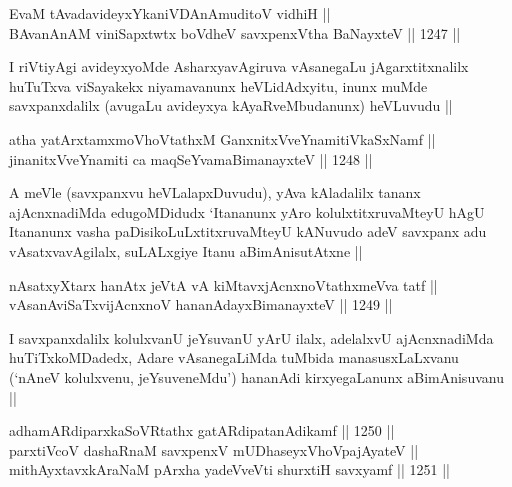 \begin{shl}
EvaM tAvadavideyxYkaniVDAnAmuditoV vidhiH || \\
BAvanAnAM viniSapxtwtx boVdheV savxpenxV\s tha BaNayxteV ||  1247 ||  
\end{shl}

\begin{artha}
I riVtiyAgi avideyxyoMde AsharxyavAgiruva vAsanegaLu jAgarxtitxnalilx huTuTxva viSayakekx niyamavanunx heVLidAdxyitu, inunx muMde savxpanxdalilx (avugaLu avideyxya kAyaRveMbudanunx) heVLuvudu ||
\end{artha}


\begin{shl}
atha yatArx\s \s tamxmoVhoVtathxM GanxnitxVveYnamitiVkaSxNamf || \\
jinanitxVveYnamiti ca maqSeYvamaBimanayxteV ||  1248 ||  
\end{shl}

\begin{artha}
A meVle (savxpanxvu heVLalapxDuvudu), yAva kAladalilx tananx ajAcnxnadiMda edugoMDidudx `Itananunx yAro kolulxtitxruvaMteyU hAgU Itananunx vasha paDisikoLuLxtitxruvaMteyU kANuvudo adeV savxpanx adu vAsatxvavAgilalx, suLALxgiye Itanu aBimAnisutAtxne ||
\end{artha}


\begin{shl}
nAsatxyXtarx hanAtx jeVtA vA kiMtavxjAcnxnoVtathxmeVva tatf || \\
vAsanAviSaTxvijAcnxnoV hananAdayxBimanayxteV ||  1249 ||  
\end{shl}

\begin{artha}
I savxpanxdalilx kolulxvanU jeYsuvanU yArU ilalx, adelalxvU ajAcnxnadiMda huTiTxkoMDadedx, Adare vAsanegaLiMda tuMbida manasusxLaLxvanu (`nAneV kolulxvenu, jeYsuveneMdu') hananAdi kirxyegaLanunx aBimAnisuvanu ||
\end{artha}


\begin{shl}
adhamARdiparxkaSoVRtathx gatARdipatanAdikamf ||  1250 || \\
parxtiVcoV dashaRnaM savxpenxV mUDhaseyxVhoVpajAyateV ||  \\
mithAyxtavxkAraNaM pArxha yadeVveVti shurxtiH savxyamf ||  1251 ||  
\end{shl}

